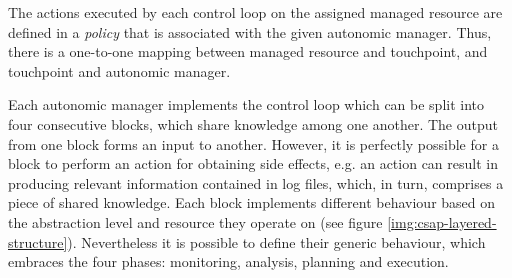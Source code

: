 The actions executed by each control loop on the assigned managed resource are defined in a \emph{policy} that is associated with the given autonomic manager. Thus, there is a one-to-one mapping between managed resource and touchpoint, and touchpoint and autonomic manager.

Each autonomic manager implements the control loop which can be split into four consecutive blocks, which share knowledge among one another. The output from one block forms an input to another. However, it is perfectly possible for a block to perform an action for obtaining side effects, e.g. an action can result in producing relevant information contained in log files, which, in turn, comprises a piece of shared knowledge. Each block implements different behaviour based on the abstraction level and resource they operate on (see figure \ref{img:csap-layered-structure}). Nevertheless it is possible to define their generic behaviour, which embraces the four phases: monitoring, analysis, planning and execution.

